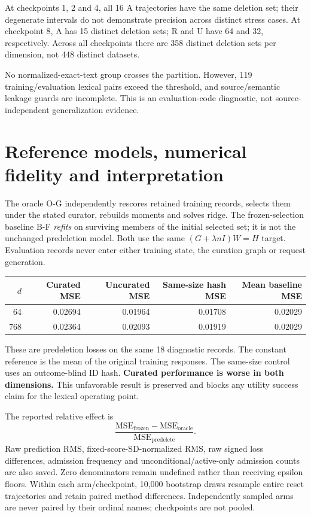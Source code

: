 \documentclass[11pt,a4paper]{article}
\begin{document}
At checkpoints 1, 2 and 4, all 16 A trajectories have the same deletion set;
their degenerate intervals do not demonstrate precision across distinct stress
cases. At checkpoint 8, A has 15 distinct deletion sets; R and U have 64 and
32, respectively. Across all checkpoints there are 358 distinct deletion sets
per dimension, not 448 distinct datasets.

No normalized-exact-text group crosses the partition. However, 119
training/evaluation lexical pairs exceed the threshold, and source/semantic
leakage guards are incomplete. This is an evaluation-code diagnostic, not
source-independent generalization evidence.
\newpage

\section*{Reference models, numerical fidelity and interpretation}
The oracle O-G independently rescores retained training records, selects them
under the stated curator, rebuilds moments and solves ridge. The frozen-selection
baseline B-F \emph{refits} on surviving members of the initial selected set;
it is not the unchanged predeletion model. Both use the same
$(G+\lambda nI)W=H$ target. Evaluation records never enter either training state,
the curation graph or request generation.

\begin{center}\small
\begin{tabular}{rrrrr}\toprule
$d$ & Curated MSE & Uncurated MSE & Same-size hash MSE & Mean baseline MSE\\\midrule
64 & 0.02694 & 0.01964 & 0.01708 & 0.02029 \\
768 & 0.02364 & 0.02093 & 0.01919 & 0.02029 \\
\bottomrule\end{tabular}\end{center}
These are predeletion losses on the same 18 diagnostic records. The constant
reference is the mean of the original training responses. The same-size control
uses an outcome-blind ID hash. \textbf{Curated performance is worse in both
dimensions.} This unfavorable result is preserved and blocks any utility
success claim for the lexical operating point.

The reported relative effect is
\[
\frac{\mathrm{MSE}_{\mathrm{frozen}}-\mathrm{MSE}_{\mathrm{oracle}}}
{\mathrm{MSE}_{\mathrm{predelete}}}.
\]
Raw prediction RMS, fixed-score-SD-normalized RMS, raw signed loss differences,
admission frequency and unconditional/active-only admission counts are also
saved. Zero denominators remain undefined rather than receiving epsilon floors.
Within each arm/checkpoint, 10,000 bootstrap draws resample entire reset
trajectories and retain paired method differences. Independently sampled arms
are never paired by their ordinal names; checkpoints are not pooled.
\end{document}

